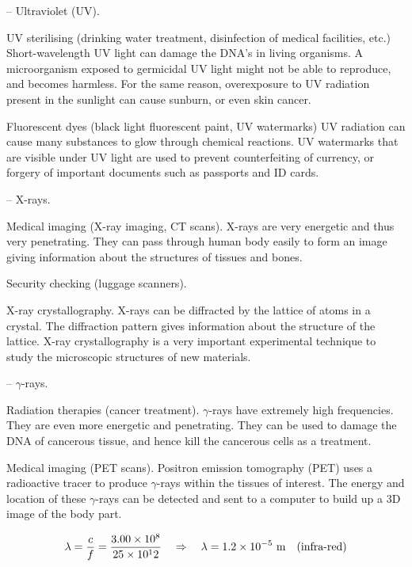 \begin{compactitem}
	\item[--] Ultraviolet (UV).
	
	\xskip UV sterilising (drinking water treatment, disinfection of medical facilities, etc.) Short-wavelength UV light can damage the DNA's in living organisms. A microorganism exposed to germicidal UV light might not be able to reproduce, and becomes harmless. For the same reason, overexposure to UV radiation present in the sunlight can cause sunburn, or even skin cancer.
		
	\xskip Fluorescent dyes (black light fluorescent paint, UV watermarks) UV radiation can cause many substances to glow through chemical reactions. UV watermarks that are visible under UV light are used to prevent counterfeiting of currency, or forgery of important documents such as passports and ID cards.
	
	\item[--] X-rays.
	
	\xskip Medical imaging (X-ray imaging, CT scans). X-rays are very energetic and thus very penetrating. They can pass through human body easily to form an image giving information about the structures of tissues and bones.
	
	\xskip Security checking (luggage scanners).
	
	\xskip X-ray crystallography. X-rays can be diffracted by the lattice of atoms in a crystal. The diffraction pattern gives information about the structure of the lattice. X-ray crystallography is a very important experimental technique to study the microscopic structures of new materials.
	
	\item[--] $\gamma$-rays.
	
	\xskip Radiation therapies (cancer treatment). $\gamma$-rays have extremely high frequencies. They are even more energetic and penetrating. They can be used to damage the DNA of cancerous tissue, and hence kill the cancerous cells as a treatment.
	
	\xskip Medical imaging (PET scans). Positron emission tomography (PET) uses a radioactive tracer to produce $\gamma$-rays within the tissues of interest. The energy and location of these $\gamma$-rays can be detected and sent to a computer to build up a 3D image of the body part.
\end{compactitem}
\newpage
{}

\begin{soln}
    
\begin{equation*}
	\lambda = \frac{c}{f} = \frac{3.00\times10^8}{25\times10^12} \quad \Rightarrow \quad \lambda = 1.2 \times 10^{-5} \text{ m} \quad \text{(infra-red)} 
\end{equation*}
\end{soln}

